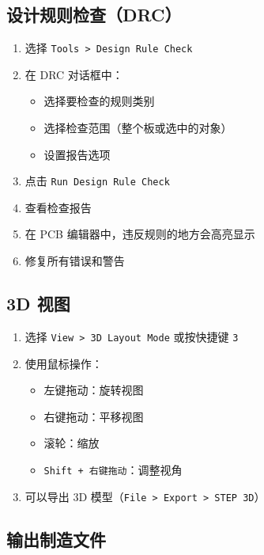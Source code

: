 \subsection{设计规则检查（DRC）}


\begin{enumerate}
  \item 选择 \lstinline{Tools > Design Rule Check}
  \item 在 DRC 对话框中：
    \begin{itemize}
      \item 选择要检查的规则类别
      \item 选择检查范围（整个板或选中的对象）
      \item 设置报告选项
    \end{itemize}
  \item 点击 \lstinline{Run Design Rule Check}
  \item 查看检查报告
  \item 在 PCB 编辑器中，违反规则的地方会高亮显示
  \item 修复所有错误和警告
\end{enumerate}

\subsection{3D 视图}


\begin{enumerate}
  \item 选择 \lstinline{View > 3D Layout Mode} 或按快捷键 \lstinline{3}
  \item 使用鼠标操作：
    \begin{itemize}
      \item 左键拖动：旋转视图
      \item 右键拖动：平移视图
      \item 滚轮：缩放
      \item \lstinline{Shift + 右键拖动}：调整视角
    \end{itemize}
  \item 可以导出 3D 模型（\lstinline{File > Export > STEP 3D}）
\end{enumerate}

\subsection{输出制造文件}


